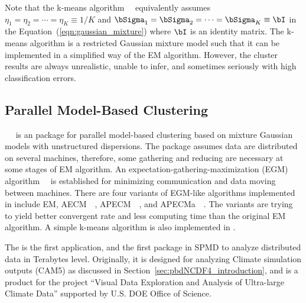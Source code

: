 Note that the k-means algorithm~\citep{Forgy1965}~
equivalently assumes
$\eta_1 = \eta_2 = \cdots = \eta_K \equiv 1/K$ and
$\bSigma_1 = \bSigma_2 = \cdots = \bSigma_K \equiv \bI$
in the Equation~(\ref{eqn:gaussian_mixture}) where
$\bI$ is an identity matrix.
The k-means algorithm is a restricted Gaussian mixture model such that
it can be implemented in a simplified way of the EM algorithm.
However, the cluster results are always unrealistic, unable to infer,
and sometimes seriously with high classification errors.


\subsection{Parallel Model-Based Clustering}

~\citep{Chen2012pmclustpackage}~
is an 
package for parallel model-based clustering based on mixture Gaussian models
with unstructured dispersions.
The package assumes data are distributed on several machines, therefore,
some gathering and reducing are necessary at some stages of EM algorithm.
An expectation-gathering-maximization (EGM)
algorithm~\citep{Chen2013}~
is established for minimizing communication and data moving between machines.
There are four variants of EGM-like algorithms implemented in 
include EM, AECM~\citep{Meng1997}~,
APECM~\citep{Chen2011}~,
and APECMa~\citep{Chen2013}~. The variants are trying to yield
better convergent rate and less computing time than the original EM algorithm.
A simple k-means algorithm is also implemented in .

The  is the first
 application, and the first
 package in SPMD to analyze distributed data in Terabytes level.
Originally, it is designed for analyzing Climate simulation outputs (CAM5)
as discussed in Section~\ref{sec:pbdNCDF4_introduction}, and
is a product for the project
``Visual Data Exploration and Analysis of Ultra-large Climate Data''
supported by U.S. DOE Office of Science.

